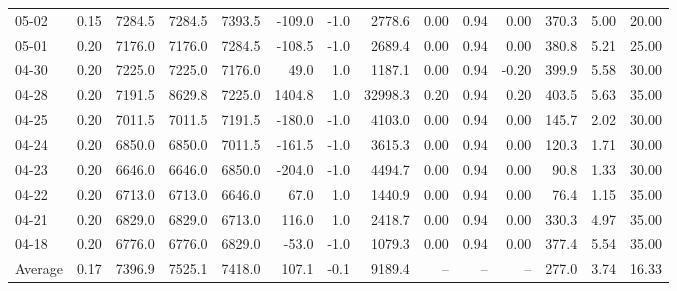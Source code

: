 \begin{threeparttable}
{\begin{tabular}{lrrrrrrrrrrrrr}
  05-02 &     0.15 & 7284.5 & 7284.5 & 7393.5 &     -109.0 &                     -1.0 &              2778.6 &       0.00 &      0.94 &           0.00 &            370.3 &            5.00 &                  20.00 \\
  05-01 &     0.20 & 7176.0 & 7176.0 & 7284.5 &     -108.5 &                     -1.0 &              2689.4 &       0.00 &      0.94 &           0.00 &            380.8 &            5.21 &                  25.00 \\
  04-30 &     0.20 & 7225.0 & 7225.0 & 7176.0 &       49.0 &                      1.0 &              1187.1 &       0.00 &      0.94 &          -0.20 &            399.9 &            5.58 &                  30.00 \\
  04-28 &     0.20 & 7191.5 & 8629.8 & 7225.0 &     1404.8 &                      1.0 &             32998.3 &       0.20 &      0.94 &           0.20 &            403.5 &            5.63 &                  35.00 \\
  04-25 &     0.20 & 7011.5 & 7011.5 & 7191.5 &     -180.0 &                     -1.0 &              4103.0 &       0.00 &      0.94 &           0.00 &            145.7 &            2.02 &                  30.00 \\
  04-24 &     0.20 & 6850.0 & 6850.0 & 7011.5 &     -161.5 &                     -1.0 &              3615.3 &       0.00 &      0.94 &           0.00 &            120.3 &            1.71 &                  30.00 \\
  04-23 &     0.20 & 6646.0 & 6646.0 & 6850.0 &     -204.0 &                     -1.0 &              4494.7 &       0.00 &      0.94 &           0.00 &             90.8 &            1.33 &                  30.00 \\
  04-22 &     0.20 & 6713.0 & 6713.0 & 6646.0 &       67.0 &                      1.0 &              1440.9 &       0.00 &      0.94 &           0.00 &             76.4 &            1.15 &                  35.00 \\
  04-21 &     0.20 & 6829.0 & 6829.0 & 6713.0 &      116.0 &                      1.0 &              2418.7 &       0.00 &      0.94 &           0.00 &            330.3 &            4.97 &                  35.00 \\
  04-18 &     0.20 & 6776.0 & 6776.0 & 6829.0 &      -53.0 &                     -1.0 &              1079.3 &       0.00 &      0.94 &           0.00 &            377.4 &            5.54 &                  35.00 \\
Average &     0.17 & 7396.9 & 7525.1 & 7418.0 &      107.1 &                     -0.1 &              9189.4 &         -- &        -- &             -- &            277.0 &            3.74 &                  16.33 \\

\end{tabular}}
\end{threeparttable}
